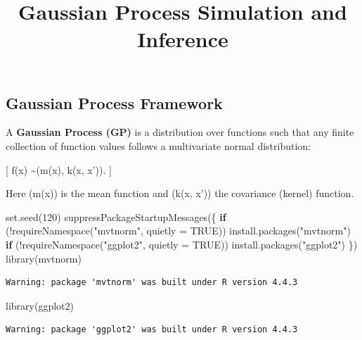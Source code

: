 \documentclass[
  letterpaper,
  DIV=11,
  numbers=noendperiod]{scrartcl}
\title{Gaussian Process Simulation and Inference}
\author{}
\date{}
\newenvironment{Shaded}{\begin{snugshade}}{\end{snugshade}}
\newcommand{\AttributeTok}[1]{\textcolor[rgb]{0.40,0.45,0.13}{#1}}
\newcommand{\ConstantTok}[1]{\textcolor[rgb]{0.56,0.35,0.01}{#1}}
\newcommand{\ControlFlowTok}[1]{\textcolor[rgb]{0.00,0.23,0.31}{\textbf{#1}}}
\newcommand{\DecValTok}[1]{\textcolor[rgb]{0.68,0.00,0.00}{#1}}
\newcommand{\FunctionTok}[1]{\textcolor[rgb]{0.28,0.35,0.67}{#1}}
\newcommand{\NormalTok}[1]{\textcolor[rgb]{0.00,0.23,0.31}{#1}}
\newcommand{\SpecialCharTok}[1]{\textcolor[rgb]{0.37,0.37,0.37}{#1}}
\newcommand{\StringTok}[1]{\textcolor[rgb]{0.13,0.47,0.30}{#1}}
\begin{document}
\maketitle


\subsection{Gaussian Process
Framework}\label{gaussian-process-framework}

A \textbf{Gaussian Process (GP)} is a distribution over functions such
that any finite collection of function values follows a multivariate
normal distribution:

{[} f(x) \sim {}(m(x), k(x, x')). {]}

Here (m(x)) is the mean function and (k(x, x')) the covariance (kernel)
function.

\begin{Shaded}
\begin{Highlighting}[]
\FunctionTok{set.seed}\NormalTok{(}\DecValTok{120}\NormalTok{)}
\FunctionTok{suppressPackageStartupMessages}\NormalTok{(\{}
  \ControlFlowTok{if}\NormalTok{ (}\SpecialCharTok{!}\FunctionTok{requireNamespace}\NormalTok{(}\StringTok{"mvtnorm"}\NormalTok{, }\AttributeTok{quietly =} \ConstantTok{TRUE}\NormalTok{)) }\FunctionTok{install.packages}\NormalTok{(}\StringTok{"mvtnorm"}\NormalTok{)}
  \ControlFlowTok{if}\NormalTok{ (}\SpecialCharTok{!}\FunctionTok{requireNamespace}\NormalTok{(}\StringTok{"ggplot2"}\NormalTok{, }\AttributeTok{quietly =} \ConstantTok{TRUE}\NormalTok{)) }\FunctionTok{install.packages}\NormalTok{(}\StringTok{"ggplot2"}\NormalTok{)}
\NormalTok{\})}
\FunctionTok{library}\NormalTok{(mvtnorm)}
\end{Highlighting}
\end{Shaded}

\begin{verbatim}
Warning: package 'mvtnorm' was built under R version 4.4.3
\end{verbatim}

\begin{Shaded}
\begin{Highlighting}[]
\FunctionTok{library}\NormalTok{(ggplot2)}
\end{Highlighting}
\end{Shaded}

\begin{verbatim}
Warning: package 'ggplot2' was built under R version 4.4.3
\end{verbatim}
\end{document}
